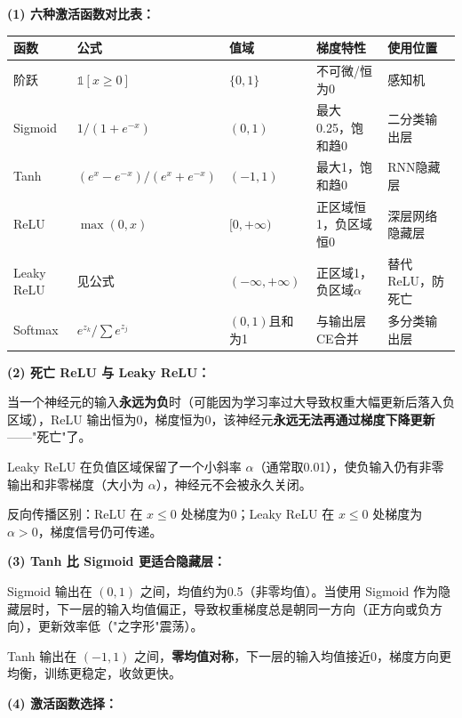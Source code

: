 \documentclass[a4paper,11pt]{ctexart}
\begin{document}
\begin{solutionbox}[参考答案与详细解析]
    \textbf{(1) 六种激活函数对比表：}

    \begin{center}
    \begin{tabular}{p{1.8cm} p{3.0cm} p{1.5cm} p{2.2cm} p{2.8cm}}
        \toprule
        函数 & 公式 & 值域 & 梯度特性 & 使用位置 \\
        \midrule
        阶跃 & $\mathbb{1}[x\geq0]$ & $\{0,1\}$ & 不可微/恒为0 & 感知机 \\[0.8em]
        Sigmoid & $1/(1+e^{-x})$ & $(0,1)$ & 最大0.25，饱和趋0 & 二分类输出层 \\[0.8em]
        Tanh & $(e^x-e^{-x})/(e^x+e^{-x})$ & $(-1,1)$ & 最大1，饱和趋0 & RNN隐藏层 \\[0.8em]
        ReLU & $\max(0,x)$ & $[0,+\infty)$ & 正区域恒1，负区域恒0 & 深层网络隐藏层 \\[0.8em]
        Leaky ReLU & 见公式 & $(-\infty,+\infty)$ & 正区域1，负区域$\alpha$ & 替代ReLU，防死亡 \\[0.8em]
        Softmax & $e^{z_k}/\sum e^{z_j}$ & $(0,1)$且和为1 & 与输出层CE合并 & 多分类输出层 \\
        \bottomrule
    \end{tabular}
    \end{center}

    \textbf{(2) 死亡 ReLU 与 Leaky ReLU：}

    当一个神经元的输入\textbf{永远为负}时（可能因为学习率过大导致权重大幅更新后落入负区域），ReLU 输出恒为0，梯度恒为0，该神经元\textbf{永远无法再通过梯度下降更新}——"死亡"了。

    Leaky ReLU 在负值区域保留了一个小斜率 $\alpha$（通常取0.01），使负输入仍有非零输出和非零梯度（大小为 $\alpha$），神经元不会被永久关闭。

    反向传播区别：ReLU 在 $x\leq0$ 处梯度为0；Leaky ReLU 在 $x\leq0$ 处梯度为 $\alpha > 0$，梯度信号仍可传递。

    \textbf{(3) Tanh 比 Sigmoid 更适合隐藏层：}

    Sigmoid 输出在 $(0,1)$ 之间，均值约为0.5（非零均值）。当使用 Sigmoid 作为隐藏层时，下一层的输入均值偏正，导致权重梯度总是朝同一方向（正方向或负方向），更新效率低（"之字形"震荡）。

    Tanh 输出在 $(-1,1)$ 之间，\textbf{零均值对称}，下一层的输入均值接近0，梯度方向更均衡，训练更稳定，收敛更快。

    \textbf{(4) 激活函数选择：}


\end{solutionbox}
\end{document}
